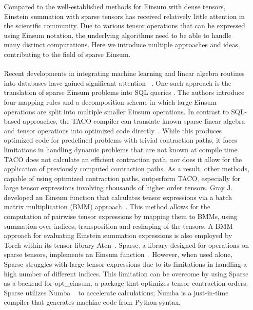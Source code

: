 Compared to the well-established methods for Einsum with dense tensors, Einstein summation with
sparse tensors has received relatively little attention in the scientific community.
Due to various tensor operations that can be expressed using Einsum notation, the
underlying algorithms need to be able to handle many distinct computations. Here we
introduce multiple approaches and ideas, contributing to the field of sparse Einsum.
\\
\\
Recent developments in integrating machine learning and linear algebra routines into
databases have gained significant attention
~\cite{Machine_Learning_LinA_and_More, du2020inmachinelearningdatabasereimaginingdeep,
       data_management_in_machine_learning, deepdive}.
One such approach is the translation of sparse Einsum problems into SQL queries
\cite{sql_einsum}. The authors introduce four mapping rules and a decomposition scheme
in which large Einsum operations are split into multiple smaller Einsum operations.
In contrast to SQL-based approaches, the TACO compiler can translate known sparse linear
algebra and tensor operations into optimized code directly~\cite{taco}. While this produces
optimized code for predefined problems with trivial contraction paths, it faces limitations
in handling dynamic problems that are not known at compile time. TACO does not calculate
an efficient contraction path, nor does it allow for the application of previously computed
contraction paths. As a result, other methods, capable of using optimized contraction paths,
outperform TACO, especially for large tensor expressions involving thousands of higher order tensors.
Gray J. developed an Einsum function that calculates tensor expressions via a batch matrix
multiplication (BMM) approach~\cite{jcmgray}. This method allows for the computation of pairwise
tensor expressions by mapping them to BMMs, using summation over indices, transposition
and reshaping of the tensors. A BMM approach for evaluating Einstein summation expressions
is also employed by Torch within its tensor library Aten~\cite{pytorch}. Sparse, a library designed for
operations on sparse tensors, implements an Einsum function~\cite{sparse}. However, when used
alone, Sparse struggles with large tensor expressions due to its limitations in handling a high
number of different indices. This limitation can be overcome by using Sparse as a backend for
opt\_einsum, a package that optimizes tensor contraction orders. Sparse utilizes Numba
~\cite{lam2015numba} to accelerate calculations; Numba is a just-in-time compiler that generates
machine code from Python syntax.